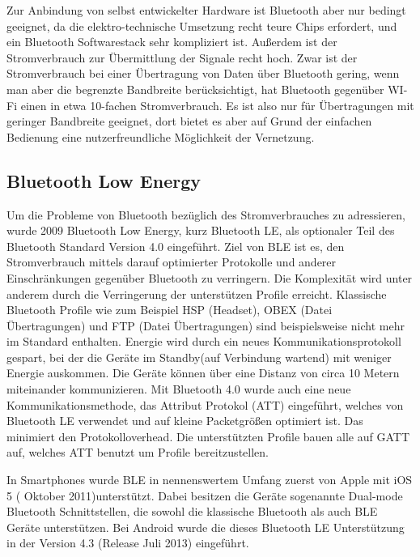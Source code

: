 \documentclass[12pt,journal,compsoc]{IEEEtran}
\begin{document}
Zur Anbindung von selbst entwickelter Hardware ist Bluetooth aber nur bedingt geeignet, da die elektro-technische Umsetzung recht teure Chips erfordert, und ein Bluetooth Softwarestack sehr kompliziert ist. Außerdem ist der Stromverbrauch zur Übermittlung der Signale recht hoch.
Zwar ist der Stromverbrauch bei einer Übertragung von Daten über Bluetooth gering, wenn man aber die begrenzte Bandbreite berücksichtigt, hat Bluetooth gegenüber WI-Fi einen in etwa 10-fachen Stromverbrauch.\cite{wireless}
Es ist also nur für Übertragungen mit geringer Bandbreite geeignet, dort bietet es aber auf Grund der einfachen Bedienung eine nutzerfreundliche Möglichkeit der Vernetzung.

\subsection{Bluetooth Low Energy}
Um die Probleme von Bluetooth bezüglich des Stromverbrauches zu adressieren, wurde 2009 Bluetooth Low Energy, kurz Bluetooth LE, als optionaler Teil des Bluetooth Standard Version 4.0 eingeführt.  
Ziel von BLE ist es, den Stromverbrauch mittels darauf optimierter Protokolle und anderer Einschränkungen gegenüber Bluetooth zu verringern.
Die Komplexität wird unter anderem durch die Verringerung der unterstützen Profile erreicht. Klassische Bluetooth Profile wie zum Beispiel HSP (Headset), OBEX (Datei Übertragungen) und FTP (Datei Übertragungen) sind beispielsweise nicht mehr im Standard enthalten.
Energie wird durch ein neues Kommunikationsprotokoll gespart, bei der die Geräte im Standby(auf Verbindung wartend) mit weniger Energie auskommen.
Die Geräte können über eine Distanz von circa 10 Metern miteinander kommunizieren.
Mit Bluetooth 4.0 wurde auch eine neue Kommunikationsmethode, das Attribut Protokol (ATT) eingeführt, welches von Bluetooth LE verwendet und auf kleine Packetgrößen optimiert ist. 
Das minimiert den Protokolloverhead.
Die unterstützten Profile bauen alle auf GATT auf, welches ATT benutzt um Profile bereitzustellen.


In Smartphones wurde BLE in nennenswertem Umfang zuerst von Apple mit iOS 5 ( Oktober 2011)unterstützt.
Dabei besitzen die Geräte sogenannte Dual-mode Bluetooth Schnittstellen, die sowohl die klassische Bluetooth als auch BLE Geräte unterstützen.
Bei Android wurde die dieses Bluetooth LE Unterstützung in der Version 4.3 (Release Juli 2013) eingeführt.
\end{document}
